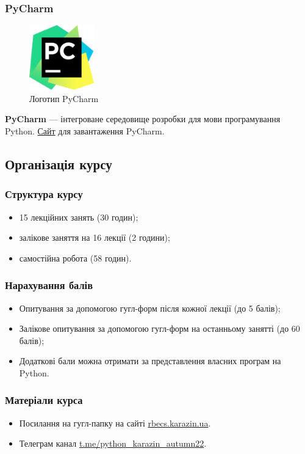 \begin{frame}
\frametitle{PyCharm}


\begin{figure}
\includegraphics[width=0.25\textwidth]{pictures/pycharm_logo.png}
\caption{Логотип PyCharm}
\label{pycharm_logo}
\end{figure}

\textbf{PyCharm} — інтегроване середовище розробки для мови програмування Python. \href{https://www.jetbrains.com/pycharm/download/}{Сайт} для завантаження PyCharm.
\end{frame}


\subsection{Організація курсу}
\begin{frame}
\frametitle{Структура курсу}
\begin{itemize}
  \item 15 лекційних занять (30 годин);
  \item залікове заняття на 16 лекції (2 години);
  \item самостійна робота (58 годин).
\end{itemize}
\end{frame}

\begin{frame}
\frametitle{Нарахування балів}
\begin{itemize}
  \item Опитування за допомогою гугл-форм після кожної лекції (до 5 балів);
  \item Залікове опитування за допомогою гугл-форм на останньому занятті (до 60 балів);
  \item Додаткові бали можна отримати за представлення власних програм на Python.
\end{itemize}
\end{frame}

\begin{frame}
\frametitle{Матеріали курса}
\begin{itemize}
  \item Посилання на гугл-папку на сайті \href{http://rbecs.karazin.ua}{rbecs.karazin.ua}.
  \item Телеграм канал \href{https://t.me/python_karazin_autumn22}{t.me/python\_karazin\_autumn22}.
\end{itemize}
\end{frame}
